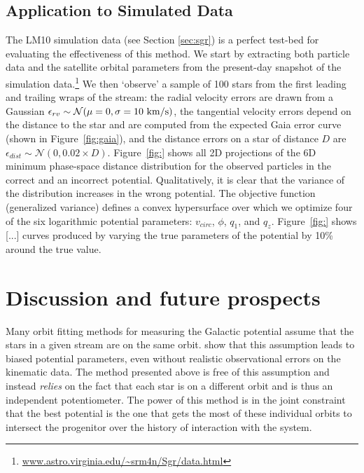 \documentclass[preprint]{aastex}
\begin{document}
\subsection{Application to Simulated Data}
The LM10 simulation data (see Section \ref{sec:sgr}) is a perfect
test-bed for evaluating the effectiveness of this method. We start by
extracting both particle data and the satellite orbital parameters
from the present-day snapshot of the simulation
data.\footnote{\url{www.astro.virginia.edu/~srm4n/Sgr/data.html}} We then
`observe' a sample of 100 stars from the first leading and trailing
wraps of the stream: the radial velocity errors are drawn from a
Gaussian $\epsilon_{rv} \sim \mathcal{N}(\mu=0,\sigma=10~{\rm km/s})$,
the tangential velocity errors depend on the distance to the star and
are computed from the expected Gaia error curve (shown in
Figure~\ref{fig:gaia}), and the distance errors on a star of distance
$D$ are $\epsilon_{dist} \sim \mathcal{N}(0,0.02\times
D)$. Figure~\ref{fig:} shows all 2D projections of the 6D minimum
phase-space distance distribution for the observed particles in the
correct and an incorrect potential. Qualitatively, it is clear that the
variance of the distribution increases in the wrong potential. The objective function
(generalized variance) defines a convex hypersurface over which we
optimize four of the six logarithmic potential parameters:
$v_{circ}$, $\phi$, $q_1$, and $q_z$. Figure~\ref{fig:} shows [...]
curves produced by varying the true parameters of the potential by
10\% around the true value.


\section{Discussion and future prospects}

Many orbit fitting methods for measuring the Galactic potential assume that the stars in a given stream are on the same
orbit. \cite{binney??} show that this assumption leads to biased
potential parameters, even without realistic observational errors on
the kinematic data. The method presented above is
free of this assumption and instead \emph{relies} on the fact that
each star is on a different orbit and is thus an independent potentiometer. The power of this method is in
the joint constraint that the best potential is the one that gets the
most of these individual orbits to intersect the progenitor
over the history of interaction with the system.
\end{document}
